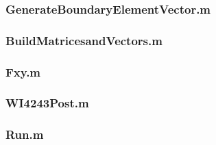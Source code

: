 \documentclass[10pt,a4paper]{article}
\begin{document}
\subsubsection{GenerateBoundaryElementVector.m}


\subsubsection{BuildMatricesandVectors.m}


\subsubsection{Fxy.m}


\subsubsection{WI4243Post.m}


\subsubsection{Run.m}

\end{document}
